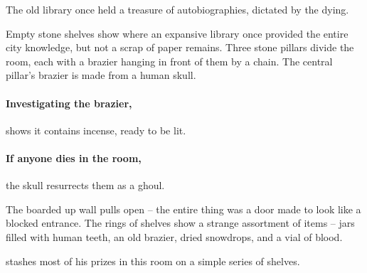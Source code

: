 \ghast

\ghoul

\label{oldlibrary}

\begin{exampletext}
  The old library once held a treasure of autobiographies, dictated by the dying.
\end{exampletext}

\begin{boxtext}

  Empty stone shelves show where an expansive library once provided the entire city knowledge, but not a scrap of paper remains.
  Three stone pillars divide the room, each with a brazier hanging in front of them by a chain.
  The central pillar's brazier is made from a human skull.

\end{boxtext}

\paragraph{Investigating the brazier,}
shows it contains incense, ready to be lit.

\paragraph{If anyone dies in the room,}
the skull resurrects them as a ghoul.


\begin{boxtext}

  The boarded up wall pulls open -- the entire thing was a door made to look like a blocked entrance.  The rings of shelves show a strange assortment of items -- jars filled with human teeth, an old brazier, dried snowdrops, and a vial of blood.

\end{boxtext}


 stashes most of his prizes in this room on a simple series of shelves.

